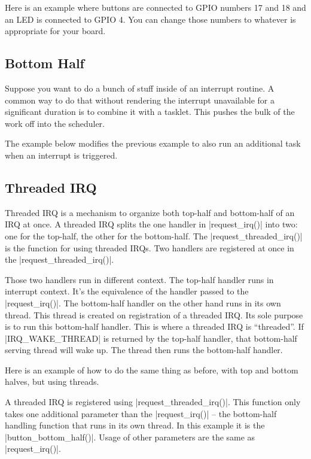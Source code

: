 \documentclass[10pt, oneside]{book}
\begin{document}
Here is an example where buttons are connected to GPIO numbers 17 and 18 and an LED is connected to GPIO 4.
You can change those numbers to whatever is appropriate for your board.


\subsection{Bottom Half}
\label{sec:bottom_half}
Suppose you want to do a bunch of stuff inside of an interrupt routine.
A common way to do that without rendering the interrupt unavailable for a significant duration is to combine it with a tasklet.
This pushes the bulk of the work off into the scheduler.

The example below modifies the previous example to also run an additional task when an interrupt is triggered.


\subsection{Threaded IRQ}

Threaded IRQ is a mechanism to organize both top-half and bottom-half of an IRQ at once.
A threaded IRQ splits the one handler in \cpp|request_irq()| into two: one for the top-half, the other for the bottom-half.
The \cpp|request_threaded_irq()| is the function for using threaded IRQs.
Two handlers are registered at once in the \cpp|request_threaded_irq()|.

Those two handlers run in different context.
The top-half handler runs in interrupt context.
It's the equivalence of the handler passed to the \cpp|request_irq()|.
The bottom-half handler on the other hand runs in its own thread.
This thread is created on registration of a threaded IRQ.
Its sole purpose is to run this bottom-half handler.
This is where a threaded IRQ is ``threaded''.
If \cpp|IRQ_WAKE_THREAD| is returned by the top-half handler, that bottom-half serving thread will wake up.
The thread then runs the bottom-half handler.

Here is an example of how to do the same thing as before, with top and bottom halves, but using threads.


A threaded IRQ is registered using \cpp|request_threaded_irq()|.
This function only takes one additional parameter than the \cpp|request_irq()| -- the bottom-half handling function that runs in its own thread.
In this example it is the \cpp|button_bottom_half()|.
Usage of other parameters are the same as \cpp|request_irq()|.
\end{document}
